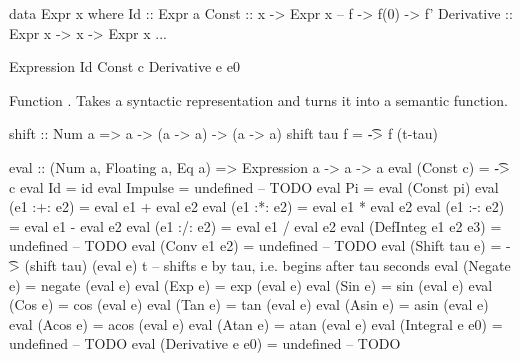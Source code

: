 \begin{code}
data Expr x where
  Id         :: Expr a 
  Const      :: x         -> Expr x 
  --            f         -> f(0) -> f' 
  Derivative :: Expr x    -> x    -> Expr x
  ... 
\end{code}

\begin{code}
  Expression         %
  Id                 %
  Const c            %
  Derivative e e0    %
  
\end{code}




\begin{codefig}
\caption{Function . Takes a syntactic representation and turns it into a semantic function.}\label{code:eval-def}
\begin{code}
shift :: Num a => a -> (a -> a) -> (a -> a)
shift tau f = \t -> f (t-tau)

eval :: (Num a, Floating a, Eq a) => Expression a -> a -> a
eval (Const c)           = \t -> c
eval Id                  = id
eval Impulse             = undefined -- TODO
eval Pi                  = eval (Const pi)
eval (e1 :+: e2)         = eval e1 + eval e2
eval (e1 :*: e2)         = eval e1 * eval e2
eval (e1 :-: e2)         = eval e1 - eval e2
eval (e1 :/: e2)         = eval e1 / eval e2
eval (DefInteg e1 e2 e3) = undefined -- TODO
eval (Conv       e1 e2)  = undefined -- TODO
eval (Shift tau e)       = \t -> (shift tau) (eval e) t -- shifts e by tau, i.e. begins after tau seconds
eval (Negate e)          = negate (eval e)
eval (Exp e)             = exp    (eval e)
eval (Sin e)             = sin    (eval e)
eval (Cos e)             = cos    (eval e)
eval (Tan e)             = tan    (eval e)
eval (Asin e)            = asin   (eval e)
eval (Acos e)            = acos   (eval e)
eval (Atan e)            = atan   (eval e)
eval (Integral   e e0)   = undefined -- TODO
eval (Derivative e e0)   = undefined -- TODO
\end{code}
\end{codefig}



